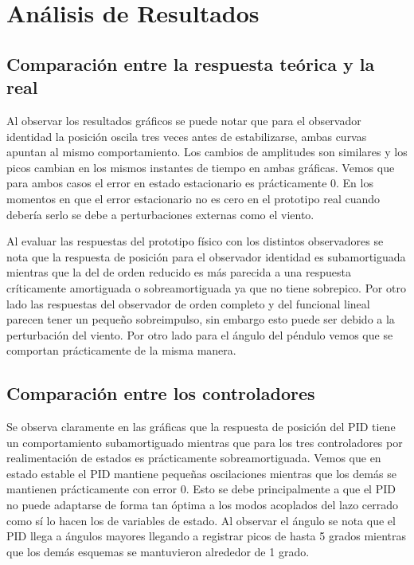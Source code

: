\section{Análisis de Resultados}

\subsection{Comparación entre la respuesta teórica y la real}

Al observar los resultados gráficos se puede notar que para el observador identidad la posición oscila tres veces antes de estabilizarse, ambas curvas apuntan al mismo comportamiento. Los cambios de amplitudes son similares y los picos cambian en los mismos instantes de tiempo en ambas gráficas. Vemos que para ambos casos el error en estado estacionario es prácticamente 0. En los momentos en que el error estacionario no es cero en el prototipo real cuando debería serlo se debe a perturbaciones externas como el viento.

Al evaluar las respuestas del prototipo físico con los distintos observadores se nota que la respuesta de posición para el observador identidad es subamortiguada mientras que la del de orden reducido es más parecida a una respuesta críticamente amortiguada o sobreamortiguada ya que no tiene sobrepico. Por otro lado las respuestas del observador de orden completo y del funcional lineal parecen tener un pequeño sobreimpulso, sin embargo esto puede ser debido a la perturbación del viento. Por otro lado para el ángulo del péndulo vemos que se comportan prácticamente de la misma manera.

\subsection{Comparación entre los controladores}

Se observa claramente en las gráficas que la respuesta de posición del PID tiene un comportamiento subamortiguado mientras que para los tres controladores por realimentación de estados es prácticamente sobreamortiguada. Vemos que en estado estable el PID mantiene pequeñas oscilaciones mientras que los demás se mantienen prácticamente con error 0. Esto se debe principalmente a que el PID no puede adaptarse de forma tan óptima a los modos acoplados del lazo cerrado como sí lo hacen los de variables de estado. Al observar el ángulo se nota que el PID llega a ángulos mayores llegando a registrar picos de hasta 5 grados mientras que los demás esquemas se mantuvieron alrededor de 1 grado.

